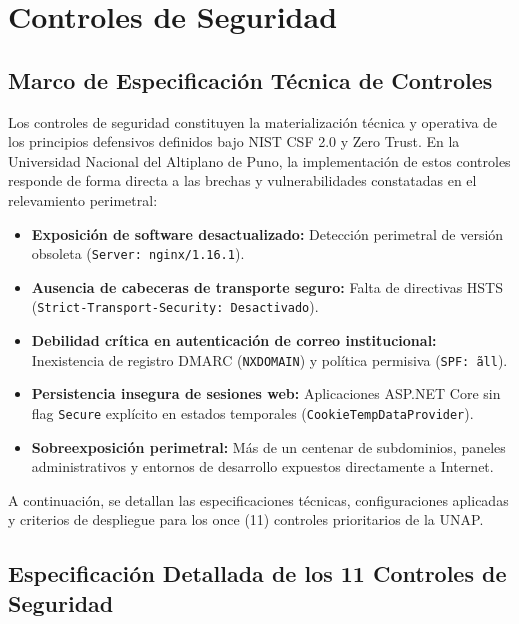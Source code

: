 \chapter{Controles de Seguridad}
\label{ch:controles_seguridad}

\section{Marco de Especificación Técnica de Controles}

Los controles de seguridad constituyen la materialización técnica y operativa de los principios defensivos definidos bajo NIST CSF 2.0 y Zero Trust. En la Universidad Nacional del Altiplano de Puno, la implementación de estos controles responde de forma directa a las brechas y vulnerabilidades constatadas en el relevamiento perimetral:

\begin{itemize}
    \item \textbf{Exposición de software desactualizado:} Detección perimetral de versión obsoleta (\texttt{Server: nginx/1.16.1}).
    \item \textbf{Ausencia de cabeceras de transporte seguro:} Falta de directivas HSTS (\texttt{Strict-Transport-\allowbreak Security:\allowbreak{} Desactivado}).
    \item \textbf{Debilidad crítica en autenticación de correo institucional:} Inexistencia de registro DMARC (\texttt{NXDOMAIN}) y política permisiva (\texttt{SPF: \~all}).
    \item \textbf{Persistencia insegura de sesiones web:} Aplicaciones ASP.NET Core sin flag \texttt{Secure} explícito en estados temporales (\texttt{CookieTempDataProvider}).
    \item \textbf{Sobreexposición perimetral:} Más de un centenar de subdominios, paneles administrativos y entornos de desarrollo expuestos directamente a Internet.
\end{itemize}

A continuación, se detallan las especificaciones técnicas, configuraciones aplicadas y criterios de despliegue para los once (11) controles prioritarios de la UNAP.

\section{Especificación Detallada de los 11 Controles de Seguridad}



